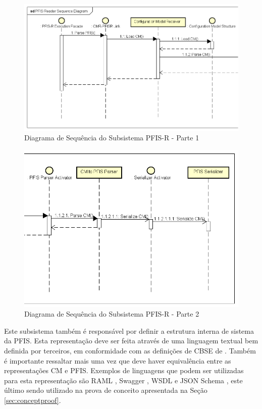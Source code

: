 \begin{figure}[htb]
    \begin{center}
        \includegraphics[scale=0.57]{imagens/PFIS_Reader_Sequence_Diagram_1.png}
    \end{center}
	\caption{\label{fig_pfisrseq1}Diagrama de Sequência do Subsistema PFIS-R - Parte 1}
\end{figure}

\begin{figure}[htb]
    \begin{center}
        \includegraphics[scale=0.59]{imagens/PFIS_Reader_Sequence_Diagram_2.png}
    \end{center}
	\caption{\label{fig_pfisrseq2}Diagrama de Sequência do Subsistema PFIS-R - Parte 2}
\end{figure}

Este subsistema também é responsável por definir a estrutura interna de sistema da PFIS. Esta representação deve ser feita através de uma linguagem textual bem definida por terceiros, em conformidade com as definições de CBSE de . Também é importante ressaltar mais uma vez que deve haver equivalência entre as representações CM e PFIS. Exemplos de linguagens que podem ser utilizadas para esta representação são RAML \cite{RAML}, Swagger \cite{SWAGGER}, WSDL \cite{BOOTH:2005} e JSON Schema \cite{PEZOA:2016}, este último sendo utilizado na prova de conceito apresentada na Seção \ref{sec:conceptproof}.

